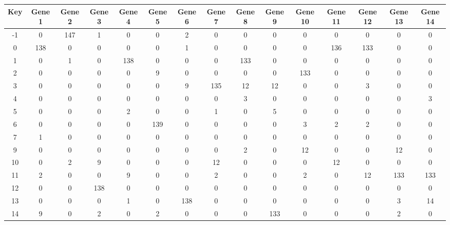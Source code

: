 \begin{tabular}{|c|c|c|c|c|c|c|c|c|c|c|c|c|c|c|}
\hline
Key & Gene 1 & Gene 2 & Gene 3 & Gene 4 & Gene 5 & Gene 6 & Gene 7 & Gene 8 & Gene 9 & Gene 10 & Gene 11 & Gene 12 & Gene 13 & Gene 14 \\
\hline
-1 & 0 & 147 & 1 & 0 & 0 & 2 & 0 & 0 & 0 & 0 & 0 & 0 & 0 & 0 \\
0 & 138 & 0 & 0 & 0 & 0 & 1 & 0 & 0 & 0 & 0 & 136 & 133 & 0 & 0 \\
1 & 0 & 1 & 0 & 138 & 0 & 0 & 0 & 133 & 0 & 0 & 0 & 0 & 0 & 0 \\
2 & 0 & 0 & 0 & 0 & 9 & 0 & 0 & 0 & 0 & 133 & 0 & 0 & 0 & 0 \\
3 & 0 & 0 & 0 & 0 & 0 & 9 & 135 & 12 & 12 & 0 & 0 & 3 & 0 & 0 \\
4 & 0 & 0 & 0 & 0 & 0 & 0 & 0 & 3 & 0 & 0 & 0 & 0 & 0 & 3 \\
5 & 0 & 0 & 0 & 2 & 0 & 0 & 1 & 0 & 5 & 0 & 0 & 0 & 0 & 0 \\
6 & 0 & 0 & 0 & 0 & 139 & 0 & 0 & 0 & 0 & 3 & 2 & 2 & 0 & 0 \\
7 & 1 & 0 & 0 & 0 & 0 & 0 & 0 & 0 & 0 & 0 & 0 & 0 & 0 & 0 \\
9 & 0 & 0 & 0 & 0 & 0 & 0 & 0 & 2 & 0 & 12 & 0 & 0 & 12 & 0 \\
10 & 0 & 2 & 9 & 0 & 0 & 0 & 12 & 0 & 0 & 0 & 12 & 0 & 0 & 0 \\
11 & 2 & 0 & 0 & 9 & 0 & 0 & 2 & 0 & 0 & 2 & 0 & 12 & 133 & 133 \\
12 & 0 & 0 & 138 & 0 & 0 & 0 & 0 & 0 & 0 & 0 & 0 & 0 & 0 & 0 \\
13 & 0 & 0 & 0 & 1 & 0 & 138 & 0 & 0 & 0 & 0 & 0 & 0 & 3 & 14 \\
14 & 9 & 0 & 2 & 0 & 2 & 0 & 0 & 0 & 133 & 0 & 0 & 0 & 2 & 0 \\
\hline
\end{tabular}